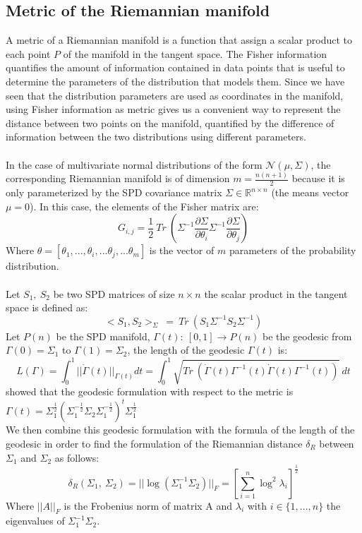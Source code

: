 \documentclass[a4paper,11pt]{report}
\begin{document}
\subsection{Metric of the Riemannian manifold}
A metric of a Riemannian manifold is a function that assign a scalar product to each point $P$ of the manifold in the tangent space. 
The Fisher information quantifies the amount of information contained in data points that is useful to determine the parameters of 
the distribution that models them.
Since we have seen that the distribution parameters are used as coordinates in the manifold, using Fisher information as metric gives us a convenient way to represent the distance between two points on the manifold, quantified by the difference of information between the two distributions using different parameters.\\\ \\
In the case of multivariate normal distributions of the form $\mathcal{N}(\mu, \Sigma)$, the corresponding Riemannian manifold is of dimension $m = \frac{n(n+1)}{2}$ because it is only parameterized by the SPD covariance matrix $\Sigma \in \mathbb{R}^{n \times n}$ (the means vector $\mu = 0$). In this case, the elements of the Fisher matrix are:
$$G_{i,j} = \frac{1}{2}\ Tr\ \left(\Sigma^{-1} \frac{\partial \Sigma}{\partial \theta_i}\Sigma^{-1} \frac{\partial \Sigma}{\partial \theta_j}\right)$$
Where $\theta = \left[ \theta_1, ..., \theta_i, ... \theta_j, ... \theta_m \right]$ is the vector of $m$ parameters of the probability distribution.\\\ \\
Let $S_1,\ S_2$ be two SPD matrices of size $n \times n$ the scalar product in the tangent space is defined as:
$$<S_1, S_2>_\Sigma \ =\ Tr\ \left(S_1 \Sigma^{-1} S_2 \Sigma^{-1}\right)$$
Let $P(n)$ be the SPD manifold, $\Gamma(t) :\ [0,1] \rightarrow P(n)$ be the geodesic from $\Gamma(0) = \Sigma_1$ to $\Gamma(1) = \Sigma_2$, the length of the geodesic $\Gamma(t)$ is:
$$L(\Gamma) = \int_{0}^{1} ||\dot{\Gamma}(t)||_{\Gamma (t)} dt = \int_{0}^{1} \sqrt{Tr\ \left(\dot{\Gamma}(t)\Gamma^{-1}(t)\dot{\Gamma}(t)\Gamma^{-1}(t)\right)}\ dt$$
\citep{BARACHANT2013172} showed that the geodesic formulation with respect to the metric is $\Gamma(t) = \Sigma_1^{\frac{1}{2}} \left(\Sigma_1^{-\frac{1}{2}} \Sigma_2 \Sigma_1^{-\frac{1}{2}} \right)^t \Sigma_1^{\frac{1}{2}}$\\
We then combine this geodesic formulation with the formula of the length of the geodesic in order to find the formulation of the Riemannian distance $\delta_R$ between $\Sigma_1$ and $\Sigma_2$ as follows:
$$\delta_R \left(\Sigma_1,\ \Sigma_2 \right) = ||\log\left(\Sigma_1^{-1} \Sigma_2\right)||_F = \left[\sum_{i=1}^n \log^2 \lambda_i \right]^{\frac{1}{2}}$$
Where $||A||_F$ is the Frobenius norm of matrix A and $\lambda_i$ with $i \in \{1, ..., n\}$ the eigenvalues of $\Sigma_1^{-1} \Sigma_2$.
\end{document}
